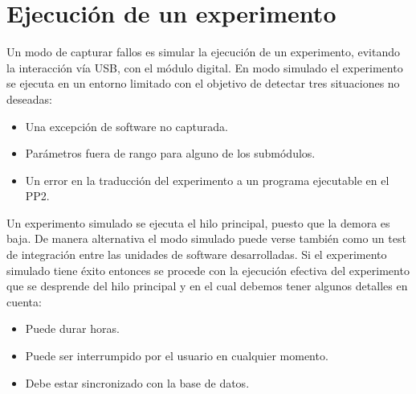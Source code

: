 \section{Ejecuci\'on de un experimento}

Un modo de capturar fallos es simular la ejecuci\'on de un experimento,
evitando la interacci\'on v\'ia USB, con el m\'odulo digital.
En modo simulado el experimento se ejecuta en un entorno limitado con el objetivo de
detectar tres situaciones no deseadas:

\begin{itemize}
\item Una excepci\'on de software no capturada.
\item Par\'ametros fuera de rango para alguno de los subm\'odulos.
\item Un error en la traducci\'on del experimento a un programa ejecutable en el PP2.
\end{itemize}

Un experimento simulado se ejecuta el hilo principal, puesto que 
la demora es baja. De manera alternativa el modo simulado puede verse tambi\'en como un 
test de integraci\'on entre las unidades de software desarrolladas.
Si el experimento simulado tiene \'exito entonces se procede con la ejecuci\'on efectiva
del experimento que se desprende del hilo principal y en el cual debemos tener 
algunos detalles en cuenta:

\begin{itemize}
    \item Puede durar horas.
    \item Puede ser interrumpido por el usuario en cualquier momento.
    \item Debe estar sincronizado con la base de datos.
\end{itemize}
\newpage